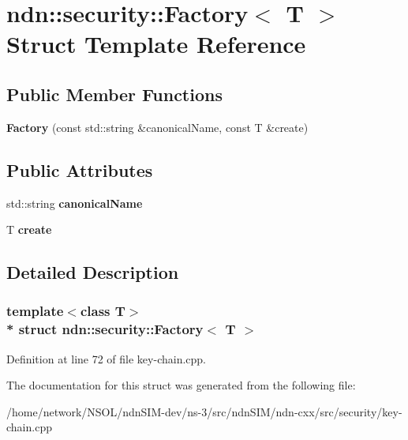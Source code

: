 \hypertarget{structndn_1_1security_1_1Factory}{}\section{ndn\+:\+:security\+:\+:Factory$<$ T $>$ Struct Template Reference}
\label{structndn_1_1security_1_1Factory}
\subsection*{Public Member Functions}
\begin{DoxyCompactItemize}
\item 
{\bfseries Factory} (const std\+::string \&canonical\+Name, const T \&create)\hypertarget{structndn_1_1security_1_1Factory_a746d924a83dd1928002e33d218e5e375}{}\label{structndn_1_1security_1_1Factory_a746d924a83dd1928002e33d218e5e375}

\end{DoxyCompactItemize}
\subsection*{Public Attributes}
\begin{DoxyCompactItemize}
\item 
std\+::string {\bfseries canonical\+Name}\hypertarget{structndn_1_1security_1_1Factory_a31c6184a3db52c6aff72756696d5576e}{}\label{structndn_1_1security_1_1Factory_a31c6184a3db52c6aff72756696d5576e}

\item 
T {\bfseries create}\hypertarget{structndn_1_1security_1_1Factory_ab853bc010bbdaa3b5dd890d4eba1f422}{}\label{structndn_1_1security_1_1Factory_ab853bc010bbdaa3b5dd890d4eba1f422}

\end{DoxyCompactItemize}


\subsection{Detailed Description}
\subsubsection*{template$<$class T$>$\\*
struct ndn\+::security\+::\+Factory$<$ T $>$}



Definition at line 72 of file key-\/chain.\+cpp.



The documentation for this struct was generated from the following file\+:\begin{DoxyCompactItemize}
\item 
/home/network/\+N\+S\+O\+L/ndn\+S\+I\+M-\/dev/ns-\/3/src/ndn\+S\+I\+M/ndn-\/cxx/src/security/key-\/chain.\+cpp\end{DoxyCompactItemize}
